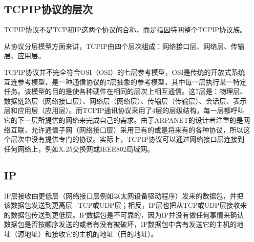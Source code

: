 \subsection{\acrshort{TCPIP}协议的层次}
\acrshort{TCPIP}协{\cf}议不{\cf}是T{\cf}CP{\cf}和I{\cf}P这{\cf}两个{\cf}协议{\cf}的合{\cf}称，{\cf}而是{\cf}指因{\cf}特网整个\acrshort{TCPIP}协议族。

从{\cf}协议{\cf}分层{\cf}模型{\cf}方面{\cf}来讲{\cf}，\acrshort{TCPIP}由{\cf}四个{\cf}层次{\cf}组成{\cf}：网{\cf}络接{\cf}口层{\cf}、网{\cf}络层{\cf}、传{\cf}输层{\cf}、应{\cf}用层。

\acrshort{TCPIP}协{\cf}议并{\cf}不完{\cf}全符{\cf}合OSI（\acrlong{OSI}）的{\cf}七层{\cf}参考{\cf}模型{\cf}，\acrshort{OSI}是{\cf}传统{\cf}的开{\cf}放式{\cf}系统{\cf}互连{\cf}参考{\cf}模型{\cf}，是{\cf}一种{\cf}通信{\cf}协议{\cf}的7{\cf}层抽{\cf}象的{\cf}参考{\cf}模型{\cf}，其{\cf}中每{\cf}一层{\cf}执行{\cf}某一{\cf}特定{\cf}任务{\cf}。该{\cf}模型{\cf}的目{\cf}的是{\cf}使各{\cf}种硬{\cf}件在{\cf}相同{\cf}的层{\cf}次上{\cf}相互{\cf}通信{\cf}。这{\cf}7层{\cf}是：{\cf}物理{\cf}层、{\cf}数据{\cf}链路{\cf}层（{\cf}网络{\cf}接口{\cf}层）{\cf}、网{\cf}络层{\cf}（网{\cf}络层{\cf}）、{\cf}传输{\cf}层（{\cf}传输{\cf}层）{\cf}、会{\cf}话层{\cf}、表{\cf}示层{\cf}和应{\cf}用层{\cf}（应{\cf}用层{\cf}）。而\acrshort{TCPIP}通{\cf}讯协{\cf}议采{\cf}用了{\cf}4层{\cf}的层{\cf}级结{\cf}构，{\cf}每一{\cf}层都{\cf}呼叫{\cf}它的{\cf}下一{\cf}层所{\cf}提供{\cf}的网{\cf}络来{\cf}完成{\cf}自己{\cf}的需{\cf}求。{\cf}由于{\cf}AR{\cf}PA{\cf}NE{\cf}T的{\cf}设计{\cf}者注{\cf}重的{\cf}是网{\cf}络互{\cf}联，{\cf}允许{\cf}通信{\cf}子网{\cf}（网{\cf}络接{\cf}口层{\cf}）采{\cf}用已{\cf}有的{\cf}或是{\cf}将来{\cf}有的{\cf}各种{\cf}协议{\cf}，所{\cf}以这{\cf}个层{\cf}次中{\cf}没有{\cf}提供{\cf}专门{\cf}的协{\cf}议。{\cf}实际{\cf}上，\acrshort{TCPIP}协{\cf}议可{\cf}以通{\cf}过网{\cf}络接{\cf}口层{\cf}连接{\cf}到任{\cf}何网{\cf}络上{\cf}，例{\cf}如X{\cf}.2{\cf}5交{\cf}换网{\cf}或I{\cf}EE{\cf}E8{\cf}02局域网。

\subsection{IP}
IP{\cf}层接{\cf}收由{\cf}更低{\cf}层（{\cf}网络{\cf}接口{\cf}层例{\cf}如以{\cf}太网{\cf}设备{\cf}驱动{\cf}程序{\cf}）发{\cf}来的{\cf}数据{\cf}包，{\cf}并把{\cf}该数{\cf}据包{\cf}发送{\cf}到更{\cf}高层{\cf}--{\cf}-T{\cf}CP{\cf}或U{\cf}DP{\cf}层；{\cf}相反{\cf}，I{\cf}P层{\cf}也把{\cf}从T{\cf}CP{\cf}或U{\cf}DP{\cf}层接{\cf}收来{\cf}的数{\cf}据包{\cf}传送{\cf}到更{\cf}低层{\cf}。I{\cf}P数{\cf}据包{\cf}是不{\cf}可靠{\cf}的，{\cf}因为{\cf}IP{\cf}并没{\cf}有做{\cf}任何{\cf}事情{\cf}来确{\cf}认数{\cf}据包{\cf}是否{\cf}按顺{\cf}序发{\cf}送的{\cf}或者{\cf}有没{\cf}有被{\cf}破坏{\cf}，I{\cf}P数{\cf}据包{\cf}中含{\cf}有发{\cf}送它{\cf}的主{\cf}机的{\cf}地址{\cf}（源{\cf}地址{\cf}）和{\cf}接收{\cf}它的{\cf}主机{\cf}的地{\cf}址（{\cf}目的{\cf}地址{\cf}）。

